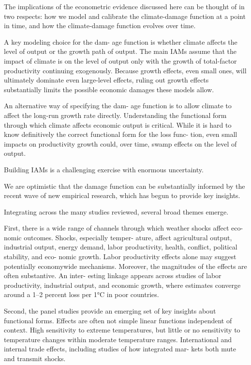 \documentclass[
]{book}
\begin{document}
The implications of the econometric evidence
discussed here can be thought of in
two respects: how we model and calibrate
the climate-damage function at a point in
time, and how the climate-damage function
evolves over time.

A key modeling choice for the dam-
age function is whether climate affects the
level of output or the growth path of output.
The main IAMs assume that
the impact of climate is on the level of output
only with the growth of total-factor productivity
continuing exogenously.
Because growth effects,
even small ones, will ultimately dominate
even large-level effects, ruling out growth
effects substantially limits the possible
economic damages these models allow.

An alternative way of specifying the dam-
age function is to allow climate to affect the
long-run growth rate directly.
Understanding the functional form through
which climate affects economic output is
critical.
While it is hard to know definitively
the correct functional form for the loss func-
tion, even small impacts on productivity
growth could, over time, swamp effects on
the level of output.

Building IAMs is a challenging exercise with enormous uncertainty.

We are optimistic that
the damage function can be substantially
informed by the recent wave of new empirical
research, which has begun to provide key
insights.

Integrating across the many studies
reviewed, several broad themes emerge.

First, there is a wide range of channels
through which weather shocks affect eco-
nomic outcomes. Shocks, especially temper-
ature, affect agricultural output, industrial
output, energy demand, labor productivity,
health, conflict, political stability, and eco-
nomic growth. Labor productivity effects
alone may suggest potentially economywide
mechanisms. Moreover, the magnitudes of
the effects are often substantive. An inter-
esting linkage appears across studies of labor
productivity, industrial output, and economic
growth, where estimates converge around a
1--2 percent loss per 1°C in poor countries.

Second, the panel studies provide an
emerging set of key insights about functional
forms.
Effects are often
not simple linear functions independent of
context.
High sensitivity to extreme temperatures, but
little or no sensitivity to temperature changes
within moderate temperature ranges.
International and internal trade effects,
including studies of how integrated mar-
kets both mute and transmit shocks.
\end{document}
